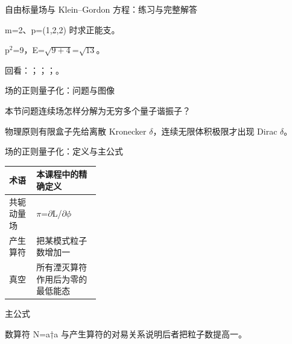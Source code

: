 \begin{frame}[t]{自由标量场与 Klein--Gordon 方程：练习与完整解答}
\footnotesize
\begin{block}{}m=2、p=(1,2,2) 时求正能支。\end{block}
\begin{exampleblock}{}p\ensuremath{^{2}}=9，E=\ensuremath{\sqrt{9+4}}=\ensuremath{\sqrt{13}}。\end{exampleblock}
\vfill
\scriptsize 回看：；；；。
\end{frame}

\begin{frame}[t]{场的正则量子化：问题与图像}
\footnotesize
\begin{block}{本节问题}连续场怎样分解为无穷多个量子谐振子？\end{block}
\begin{block}{物理原则}\quad 有限盒子先给离散 Kronecker \ensuremath{\delta}，连续无限体积极限才出现 Dirac \ensuremath{\delta}。\end{block}
\end{frame}

\begin{frame}[t]{场的正则量子化：定义与主公式}
\footnotesize\begin{tabularx}{\linewidth}{p{0.30\linewidth}Y}
\toprule 术语 & 本课程中的精确定义\\\midrule
{} 共轭动量场 & \ensuremath{\pi}=\ensuremath{\partial}L/\allowbreak{}\ensuremath{\partial}\ensuremath{\phi}̇\\
 产生算符 & 把某模式粒子数增加一\\
 真空 & 所有湮灭算符作用后为零的最低能态\\
\bottomrule\end{tabularx}\vspace{0.15cm}
\begin{block}{ 主公式}\centering{}\end{block}
数算符 N=a†a 与产生算符的对易关系说明后者把粒子数提高一。
\end{frame}

